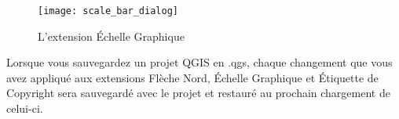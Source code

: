 \begin{figure}[ht]
   \begin{center}
   \texttt{[image: scale\_bar\_dialog]}
   \caption{L'extension Échelle Graphique \nixcaption}\label{fig:scale_bar}
\end{center}  
\end{figure}

\begin{Tip}\caption{\textsc{Sauvegarde des paramètres de l'extension avec le projet}}
Lorsque vous sauvegardez un projet QGIS en .qgs, chaque changement que 
vous avez appliqué aux extensions Flèche Nord, Échelle Graphique et Étiquette 
de Copyright sera sauvegardé avec le projet et restauré au prochain chargement 
de celui-ci.
\end{Tip}
